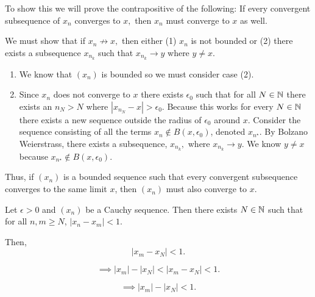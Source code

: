 \documentclass{report}
\begin{document}
\bigskip
{}

\begin{myproof}
  To show this we will prove the contrapositive of the following: If every convergent subsequence of $x_n$ converges to $x,$ then  $x_n$ must converge to $x$ as well. 

We must show that if $x_n \not\rightarrow x,$ then either (1) $x_n$ is not bounded or (2) there exists a subsequence $x_{n_k}$ such that $x_{n_k} \rightarrow y$ where $y \not= x.$


\begin{enumerate}
\item We know that $(x_n)$ is bounded so we must consider case (2).
  \item Since $x_n$ does not converge to $x$ there exists $\epsilon_0$ such that for all $N \in \NN$ there exists an $n_N > N$ where $|x_{n_N} - x| > \epsilon_0.$ Because this works for every $N \in \NN$ there exists a new sequence outside the radius of $\epsilon_0$ around $x.$ Consider the sequence consisting of all the terms $x_n \not\in B(x,\epsilon_0)$, denoted $x_{n^\star}.$ By Bolzano Weierstrass, there exists a subsequence, $x_{n_k},$ where $x_{n_k} \rightarrow y.$ We know  $y \not=x$ because $x_{n^\star} \not\in  B(x,\epsilon_0).$

\end{enumerate}

Thus, if $(x_n)$ is a bounded sequence such that every convergent subsequence converges to the same limit $x$, then $(x_n)$ must also converge to $x$.
\end{myproof}
\bigskip
\bigskip
{}

Let $\epsilon >0$ and $(x_n)$ be a Cauchy sequence. Then there exists $N \in \NN$ such that for all $n,m \geq N$, $\left| x_n - x_m\right| < 1.$ 

Then, 
 $$ \left|x_m - x_N\right| < 1.$$

$$ \implies \left| x_m \right| - \left|x_N\right| < \left| x_m - x_N\right| < 1.$$


$$ \implies \left| x_m \right| - \left|x_N\right|  < 1.$$
\end{document}

